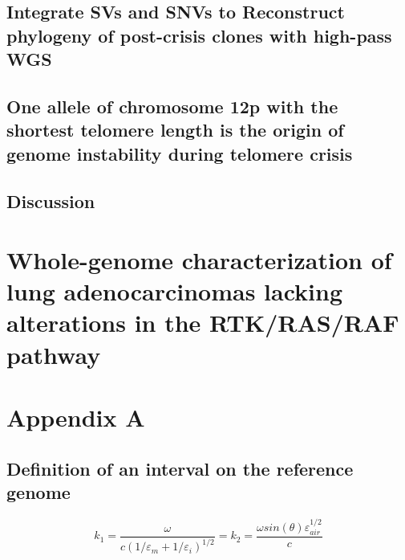 \documentclass[phd,tocprelim]{cornell}
\begin{document}
\section{Integrate SVs and SNVs to Reconstruct phylogeny of post-crisis clones with high-pass WGS}

\section{One allele of chromosome 12p with the shortest telomere length is the origin of genome instability during telomere crisis}

\section{Discussion}

\chapter{Whole-genome characterization of lung adenocarcinomas lacking alterations in the RTK/RAS/RAF pathway}


\appendix
\chapter{Appendix A}

\section{Definition of an interval on the reference genome}

\begin{equation}
    k_1=\frac{\omega }{c({1/\varepsilon_m + 1/\varepsilon_i})^{1/2}}=k_2=\frac{\omega
    sin(\theta)\varepsilon_{air}^{1/2}}{c}
\end{equation}



\end{document}
